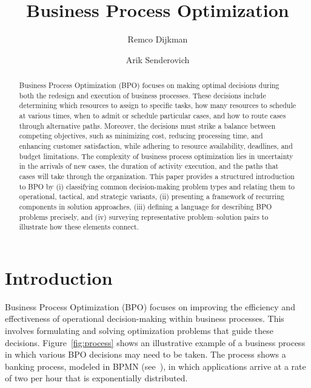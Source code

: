 \documentclass[runningheads]{llncs}
\begin{document}
\title{Business Process Optimization}

\author{Remco Dijkman \and
Arik Senderovich}


\maketitle

\begin{abstract}
Business Process Optimization (BPO) focuses on making optimal decisions during both the redesign and execution of business processes. These decisions include determining which resources to assign to specific tasks, how many resources to schedule at various times, when to admit or schedule particular cases, and how to route cases through alternative paths.
Moreover, the decisions must strike a balance between competing objectives, such as minimizing cost, reducing processing time, and enhancing customer satisfaction, while adhering to resource availability, deadlines, and budget limitations. The complexity of business process optimization lies in uncertainty in the arrivals of new cases, the duration of activity execution, and the paths that cases will take through the organization.
This paper provides a structured introduction to BPO by (i) classifying common decision-making problem types and relating them to operational, tactical, and strategic variants, (ii) presenting a framework of recurring components in solution approaches, (iii) defining a language for describing BPO problems precisely, and (iv) surveying representative problem--solution pairs to illustrate how these elements connect.
\end{abstract}


\section{Introduction}

Business Process Optimization (BPO) focuses on improving the efficiency and effectiveness of operational decision-making within business processes. This involves formulating and solving optimization problems that guide these decisions. Figure~\ref{fig:process} shows an illustrative example of a business process in which various BPO decisions may need to be taken. The process shows a banking process, modeled in BPMN (see~\cite{OMG_BPMN_2_0_2}), in which applications arrive at a rate of two per hour that is exponentially distributed. 
\end{document}
